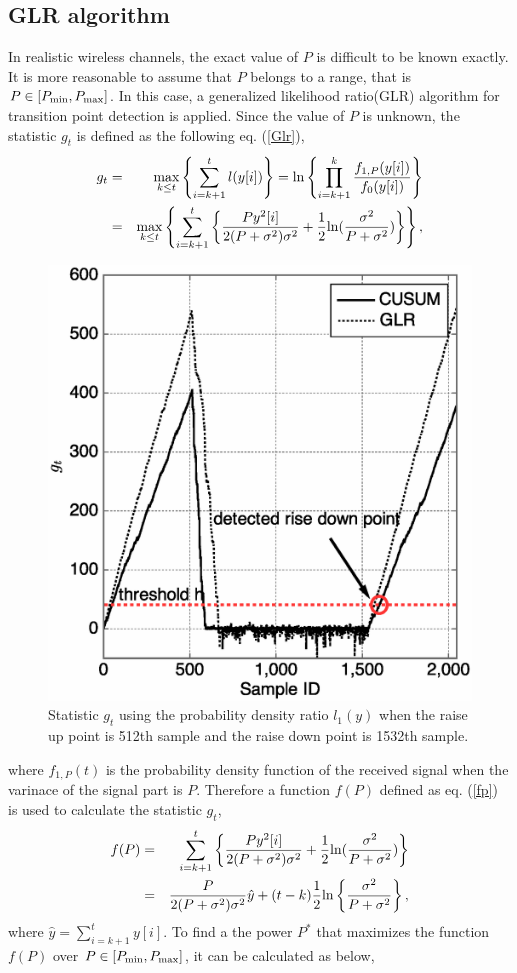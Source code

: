 \subsection{GLR algorithm}
In realistic wireless channels, the exact value of $P$ is difficult to be known exactly. It is more reasonable to assume that $P$ belongs to a range, that is $P\in[P_{{\rm min}}, P_{\rm {max}}]$. In this case, a generalized likelihood ratio(GLR) algorithm\cite{ref:GLR} for transition point detection is applied. Since the value of $P$ is unknown, the statistic $g_t$ is defined as the following eq. (\ref{Glr}),
\begin{eqnarray}
g_t &=& \max_{k \leq t}\left\{ \sum_{i=k+1}^tl(y[i])\right\}={\rm ln}\left\{\prod_{i=k+1}^k\frac{f_{1,P}(y[i])}{f_0(y[i])}\right\} \nonumber \\ 
   &=& \max_{k \leq t}\left\{\sum_{i=k+1}^t\left\{ \frac{Py^2[i]}{2(P+\sigma^2)\sigma^2}+\frac{1}{2} {\rm ln}(\frac{\sigma^2}{P+\sigma^2}) \right\}\right\},
\label{Glr}
\end{eqnarray}
\begin{figure}[t]
\centering
\includegraphics[width=120mm]{ON2OFF.eps}
\caption{Statistic $g_t$ using the probability density ratio $l_1(y)$ when the raise up point is 512th sample and the raise down point is 1532th sample.}
\label{ON2OFF}
\end{figure}
where $f_{1,P}(t)$ is the probability density function of the received signal when the varinace of the signal part is $P$. Therefore a function $f(P)$ defined as eq. (\ref{fp}) is used to calculate the statistic $g_t$,
\begin{eqnarray}
f(P) &=& \sum_{i=k+1}^t\left\{ \frac{Py^2[i]}{2(P+\sigma^2)\sigma^2}+\frac{1}{2} {\rm ln}(\frac{\sigma^2}{P+\sigma^2})\right\} \nonumber\\ 
&=&\frac{P}{2(P+\sigma^2)\sigma^2}\hat{y}+(t-k)\frac{1}{2}{\rm ln}\left\{ \frac{\sigma^2}{P+\sigma^2} \right\},
\label{fp}
\end{eqnarray}
where $\hat{y}=\sum_{i=k+1}^t y[i]$. To find a the power $P^{*}$ that maximizes the function $f(P)$ over $P \in [P_{{\rm min}}, P_{{\rm max}}]$, it can be calculated as below,

